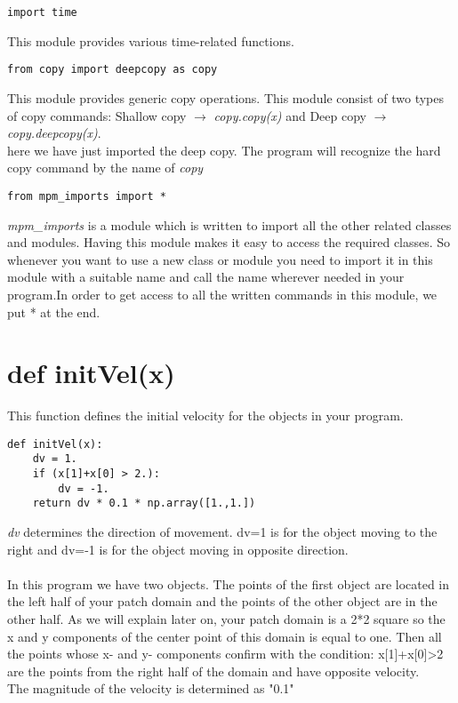 \documentclass[11pt,fleqn]{book} %
\begin{document}
\begin{lstlisting}
import time
\end{lstlisting}

This module provides various time-related functions.

\begin{lstlisting}
from copy import deepcopy as copy
\end{lstlisting}

This module provides generic copy operations. This module consist of two types of copy commands: Shallow copy $\rightarrow$ \emph{copy.copy(x)} and Deep copy $\rightarrow$ \emph{copy.deepcopy(x)}. \\
here we have just imported the deep copy. The program will recognize the hard copy command by the name of \emph{copy}

\begin{lstlisting}
from mpm_imports import *
\end{lstlisting}
\emph{mpm\_imports} is a module which is written to import all the other related classes and modules. Having this module makes it easy to access the required classes. So whenever you want to use a new class or module you need to import it in this module with a suitable name and call the name wherever needed in your program.In order to get access to all the written commands in this module, we put * at the end. 

\section{def initVel(x)}

This function defines the initial velocity for the objects in your program. \\ 

\begin{lstlisting}
def initVel(x):
    dv = 1.
    if (x[1]+x[0] > 2.):
        dv = -1.
    return dv * 0.1 * np.array([1.,1.])
\end{lstlisting}

\emph{dv} determines the direction of movement. dv=1 is for the object moving to the right and dv=-1 is for the object moving in opposite direction. \\ \\
In this program we have two objects. The points of the first object are located in the left half of your patch domain and the points of the other object are in the other half. As we will explain later on, your patch domain is a 2*2 square so the x and y components of the center point of this domain is equal to one. Then all the points whose x- and y- components confirm with the condition: x[1]+x[0]>2 are the points from the right half of the domain and have opposite velocity. 
\\ The magnitude of the velocity is determined as "0.1" 
\end{document}
